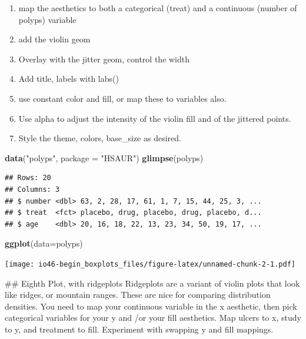 \documentclass[
]{book}
\newenvironment{Shaded}{\begin{snugshade}}{\end{snugshade}}
\newcommand{\DataTypeTok}[1]{\textcolor[rgb]{0.13,0.29,0.53}{#1}}
\newcommand{\KeywordTok}[1]{\textcolor[rgb]{0.13,0.29,0.53}{\textbf{#1}}}
\newcommand{\NormalTok}[1]{#1}
\newcommand{\StringTok}[1]{\textcolor[rgb]{0.31,0.60,0.02}{#1}}
\providecommand{\tightlist}{%
  \setlength{\itemsep}{0pt}\setlength{\parskip}{0pt}}
\begin{document}
\begin{enumerate}
\def\labelenumi{\arabic{enumi}.}
\tightlist
\item
  map the aesthetics to both a categorical (treat) and a continuous (number of polyps) variable
\item
  add the violin geom
\item
  Overlay with the jitter geom, control the width
\item
  Add title, labels with labs()
\item
  use constant color and fill, or map these to variables also.
\item
  Use alpha to adjust the intensity of the violin fill and of the jittered points.
\item
  Style the theme, colors, base\_size as desired.
\end{enumerate}

\begin{Shaded}
\begin{Highlighting}[]
\KeywordTok{data}\NormalTok{(}\StringTok{"polyps"}\NormalTok{, }\DataTypeTok{package =} \StringTok{"HSAUR"}\NormalTok{)}
\KeywordTok{glimpse}\NormalTok{(polyps)}
\end{Highlighting}
\end{Shaded}

\begin{verbatim}
## Rows: 20
## Columns: 3
## $ number <dbl> 63, 2, 28, 17, 61, 1, 7, 15, 44, 25, 3, ...
## $ treat  <fct> placebo, drug, placebo, drug, placebo, d...
## $ age    <dbl> 20, 16, 18, 22, 13, 23, 34, 50, 19, 17, ...
\end{verbatim}

\begin{Shaded}
\begin{Highlighting}[]
\KeywordTok{ggplot}\NormalTok{(}\DataTypeTok{data=}\NormalTok{polyps)}
\end{Highlighting}
\end{Shaded}

\texttt{[image: io46-begin\_boxplots\_files/figure-latex/unnamed-chunk-2-1.pdf]}

\#\# Eighth Plot, with ridgeplots
Ridgeplots are a variant of violin plots that look like ridges, or mountain ranges. These are nice for comparing distribution densities.
You need to map your continuous variable in the x aesthetic, then pick categorical variables for your y and /or your fill aesthetics.
Map ulcers to x, study to y, and treatment to fill. Experiment with swapping y and fill mappings.
\end{document}
